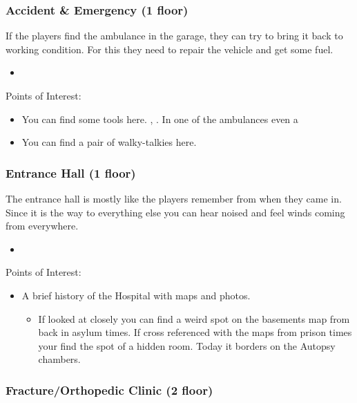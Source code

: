 \documentclass[11pt]{article}
\begin{document}
{\subsubsection{Accident \& Emergency (1 floor)}
\label{sec:orgc5987ab}

If the players find the ambulance in the garage, they can try to bring it back to working condition. For this they need to repair the vehicle and get some fuel.

\begin{itemize}
\item {}
\end{itemize}

Points of Interest:
\begin{itemize}
\item You can find some tools here. , . In one of the ambulances even a 
\item You can find a pair of walky-talkies here.
\end{itemize}
\subsubsection{Entrance Hall (1 floor)}
\label{sec:org99e902d}

The entrance hall is mostly like the players remember from when they came in. Since it is the way to everything else you can hear noised and feel winds coming from everywhere.

\begin{itemize}
\item {}
\end{itemize}


Points of Interest:
\begin{itemize}
\item A brief history of the Hospital with maps and photos.
\begin{itemize}
\item If looked at closely you can find a weird spot on the basements map from back in asylum times.
If cross referenced with the maps from prison times your find the spot of a hidden room. Today it borders on the Autopsy chambers.
\end{itemize}
\end{itemize}
\subsubsection{Fracture/Orthopedic Clinic (2 floor)}
\label{sec:org02ba05b}

}
\end{document}
